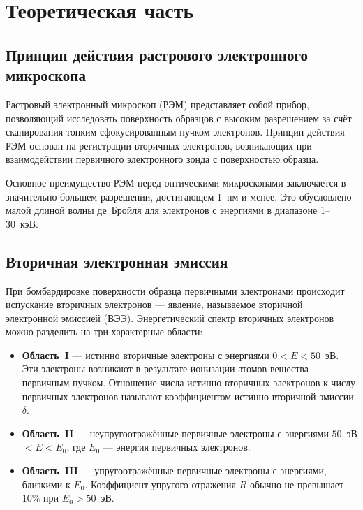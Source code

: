 \documentclass[12pt, a4paper]{article}
\begin{document}
\newpage

\section*{Теоретическая часть}

\subsection*{Принцип действия растрового электронного микроскопа}

Растровый электронный микроскоп (РЭМ) представляет собой прибор, позволяющий исследовать поверхность образцов с высоким разрешением за счёт сканирования тонким сфокусированным пучком электронов. Принцип действия РЭМ основан на регистрации вторичных электронов, возникающих при взаимодействии первичного электронного зонда с поверхностью образца.

Основное преимущество РЭМ перед оптическими микроскопами заключается в значительно большем разрешении, достигающем 1~нм и менее. Это обусловлено малой длиной волны де~Бройля для электронов с энергиями в диапазоне 1--30~кэВ.

\subsection*{Вторичная электронная эмиссия}

При бомбардировке поверхности образца первичными электронами происходит испускание вторичных электронов --- явление, называемое вторичной электронной эмиссией (ВЭЭ). Энергетический спектр вторичных электронов можно разделить на три характерные области:

\begin{itemize}
    \item \textbf{Область~I} --- истинно вторичные электроны с энергиями $0 < E < 50$~эВ. Эти электроны возникают в результате ионизации атомов вещества первичным пучком. Отношение числа истинно вторичных электронов к числу первичных электронов называют коэффициентом истинно вторичной эмиссии $\delta$.    
    \item \textbf{Область~II} --- неупругоотражённые первичные электроны с энергиями $50$~эВ $< E < E_0$, где $E_0$ --- энергия первичных электронов.   
    \item \textbf{Область~III} --- упругоотражённые первичные электроны с энергиями, близкими к $E_0$. Коэффициент упругого отражения $R$ обычно не превышает 10\% при $E_0 > 50$~эВ.
\end{itemize}
\end{document}
